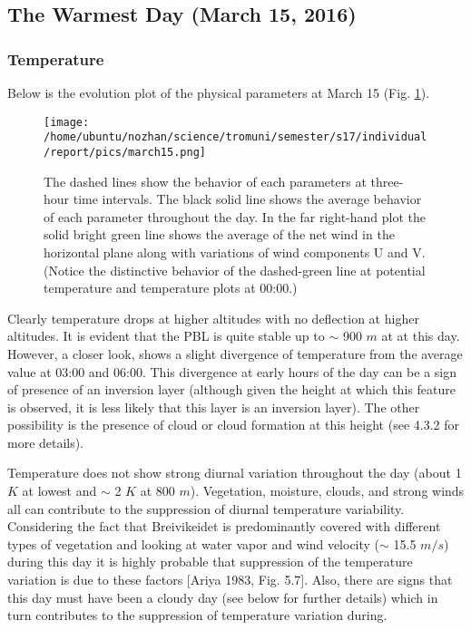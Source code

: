 \documentclass[a4paper,12pt]{article}
\numberwithin{equation}{section} %
\begin{document}

\subsection{The Warmest Day (March 15, 2016)}

\subsubsection{Temperature}

Below is the evolution plot of the physical parameters at March 15 (Fig. \ref{march15}).

\begin{figure}[bhp]
\texttt{[image: /home/ubuntu/nozhan/science/tromuni/semester/s17/individual/report/pics/march15.png]}
\caption{The dashed lines show the behavior of each parameters at three-hour time intervals. The black solid line shows the average behavior of each parameter throughout the day. In the far right-hand plot the solid bright green line shows the average of the net wind in the horizontal plane along with variations of wind components U and V. (Notice the distinctive behavior of the dashed-green line at potential temperature and temperature plots at 00:00.)}
\label{march15}
\end{figure}

\vspace{1cm}

Clearly temperature drops at higher altitudes with no deflection at higher altitudes. It is evident that the PBL is quite stable up to $\sim$ 900 $m$ at at this day. However, a closer look, shows a slight divergence of temperature from the average value at 03:00 and 06:00. This divergence at early hours of the day can be a sign of presence of an inversion layer (although given the height at which this feature is observed, it is less likely that this layer is an inversion layer). The other possibility is the presence of cloud or cloud formation at this height (see 4.3.2 for more details). 

Temperature does not show strong diurnal variation throughout the day (about 1 $K$ at lowest and $\sim$ 2 $K$ at 800 $m$). Vegetation, moisture, clouds, and strong winds all can contribute to the suppression of diurnal temperature variability. Considering the fact that Breivikeidet is predominantly covered with different types of vegetation and looking at water vapor and wind velocity ($\sim$ 15.5 $m/s$) during this day it is highly probable that suppression of the temperature variation is due to these factors [Ariya 1983, Fig. 5.7]. Also, there are signs that this day must have been a cloudy day (see below for further details) which in turn contributes to the suppression of temperature variation during.
\end{document}
